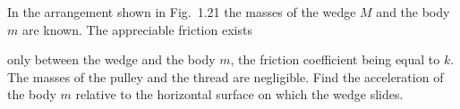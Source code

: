 \item In the arrangement shown in Fig.\ 1.21 the masses of the wedge $M$ and the body $m$ are known. The appreciable friction exists
    \begin{center}
    \end{center}
    only between the wedge and the body $m$, the friction coefficient being equal to $k$. The masses of the pulley and the thread are negligible. Find the acceleration of the body $m$ relative to the horizontal surface on which the wedge slides.